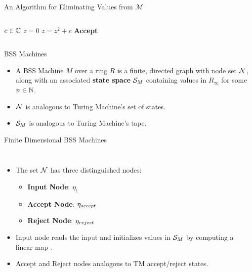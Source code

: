 \documentclass[c]{beamer}
\begin{document}
\begin{frame}{An Algorithm for Eliminating Values from $\mathcal{M}$}

  \begin{columns}
    \begin{algorithmic}
      \Require $c \in \mathbb{C}$
      \State $z = 0$
      \State $z = z^2 +c$
      \EndWhile
      \State \textbf{Accept}
    \end{algorithmic}

    \begin{center}
      \scaletopagewidth[0.9]{\mandelrecsimple{}}
    \end{center}
  \end{columns}
\end{frame}

\begin{frame}{BSS Machines}

  \begin{itemize}
  \item A BSS Machine $M$ over a ring $R$ is a finite, directed graph
    with node set $\mathcal{N}$, along with an associated \textbf{state
      space} $\mathcal{S}_M$ containing values in $R_\infty$ for some $n
    \in \mathbb{N}$.\pause
  \item $\mathcal{N}$ is analogous to Turing Machine's set of
    states.
  \item $\mathcal{S}_M$ is analogous to Turing Machine's tape.
  \end{itemize}

\end{frame}

\begin{frame}{Finite Dimensional BSS Machines}
  \begin{columns}
    
    \begin{itemize}
    \item The set $\mathcal{N}$ has three distinguished nodes:
      \begin{itemize}
      \item \textbf{Input Node}: $\eta_1$
      \item \textbf{Accept Node}: $\eta_{accept}$
      \item \textbf{Reject Node}: $\eta_{reject}$
      \end{itemize}
    \item Input node reads the input and initializes values in
      $\mathcal{S}_M$ by computing a linear map
      .
    \item Accept and Reject nodes analogous to TM accept/reject
      states.
    \end{itemize}
    \begin{center}
      \scaletopagewidth[.9]{\mandelrecpI{}}
    \end{center}
  \end{columns}

\end{frame}
\end{document}
